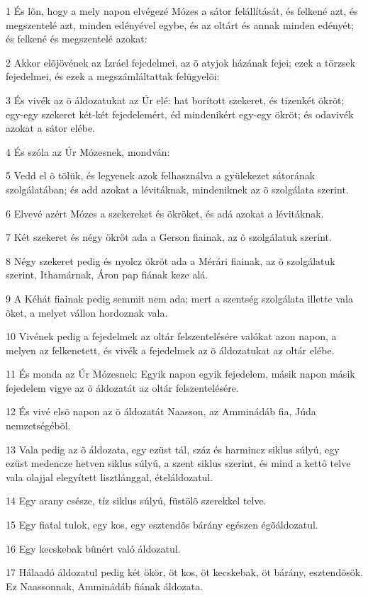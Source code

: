 \par 1 És lõn, hogy a mely napon elvégezé Mózes a sátor felállítását, és felkené azt, és megszentelé azt, minden edényével egybe, és az oltárt és annak minden edényét; és felkené és megszentelé azokat:
\par 2 Akkor elõjövének az Izráel fejedelmei, az õ atyjok házának fejei; ezek a törzsek fejedelmei, és ezek a megszámláltattak felügyelõi:
\par 3 És vivék az õ áldozatukat az Úr elé: hat borított szekeret, és tizenkét ökröt; egy-egy szekeret két-két fejedelemért, éd mindenikért egy-egy ökröt; és odavivék azokat a sátor elébe.
\par 4 És szóla az Úr Mózesnek, mondván:
\par 5 Vedd el õ tõlük, és legyenek azok felhasználva a gyülekezet sátorának szolgálatában; és add azokat a lévitáknak, mindeniknek az õ szolgálata szerint.
\par 6 Elvevé azért Mózes a szekereket és ökröket, és adá azokat a lévitáknak.
\par 7 Két szekeret és négy ökröt ada a Gerson fiainak, az õ szolgálatuk szerint.
\par 8 Négy szekeret pedig és nyolcz ökröt ada a Mérári fiainak, az õ szolgálatuk szerint, Ithamárnak, Áron pap fiának keze alá.
\par 9 A Kéhát fiainak pedig semmit nem ada; mert a szentség szolgálata illette vala õket, a melyet vállon hordoznak vala.
\par 10 Vivének pedig a fejedelmek az oltár felszentelésére valókat azon napon, a melyen az felkenetett, és vivék a fejedelmek az õ áldozatukat az oltár elébe.
\par 11 És monda az Úr Mózesnek: Egyik napon egyik fejedelem, másik napon másik fejedelem vigye az õ áldozatát az oltár felszentelésére.
\par 12 És vivé elsõ napon az õ áldozatát Naasson, az Amminádáb fia, Júda nemzetségébõl.
\par 13 Vala pedig az õ áldozata, egy ezüst tál, száz és harmincz siklus súlyú, egy ezüst medencze hetven siklus súlyú, a szent siklus szerint, és mind a kettõ telve vala olajjal elegyített lisztlánggal, ételáldozatul.
\par 14 Egy arany csésze, tíz siklus súlyú, füstölõ szerekkel telve.
\par 15 Egy fiatal tulok, egy kos, egy esztendõs bárány egészen égõáldozatul.
\par 16 Egy kecskebak bûnért való áldozatul.
\par 17 Hálaadó áldozatul pedig két ökör, öt kos, öt kecskebak, öt bárány, esztendõsök. Ez Naassonnak, Amminádáb fiának áldozata.
